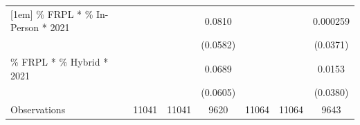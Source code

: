 \begin{tabular}{l*{6}{c}}
[1em]
\% FRPL * \% In-Person * 2021&            &            &      0.0810&            &            &    0.000259\\
                    &            &            &    (0.0582)&            &            &    (0.0371)\\
[1em]
\% FRPL * \% Hybrid * 2021&            &            &      0.0689&            &            &      0.0153\\
                    &            &            &    (0.0605)&            &            &    (0.0380)\\
\hline
Observations        &       11041&       11041&        9620&       11064&       11064&        9643\\
\hline\hline
\end{tabular}
